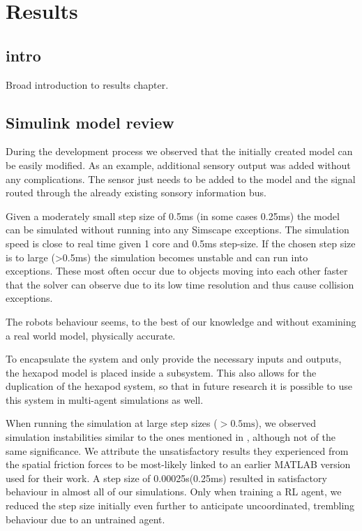 \chapter{Results}
\label{ch:results}
\section{intro}
Broad introduction to results chapter.




\section{Simulink model review}
During the development process we observed that the initially created model can be easily modified.
As an example, additional sensory output was added without any complications.
The sensor just needs to be added to the model and the signal routed through the already existing sonsory information bus.

Given a moderately small step size of 0.5ms (in some cases 0.25ms) the model can be simulated without running into any Simscape exceptions.
The simulation speed is close to real time given 1 core and 0.5ms step-size.
If the chosen step size is to large (>0.5ms) the simulation becomes unstable and can run into exceptions.
These most often occur due to objects moving into each other faster that the solver can observe due to its low time resolution and thus cause collision exceptions.

The robots behaviour seems, to the best of our knowledge and without examining a real world model, physically accurate.

To encapsulate the system and only provide the necessary inputs and outputs, the hexapod model is placed inside a subsystem.
This also allows for the duplication of the hexapod system, so that in future research it is possible to use this system in multi-agent simulations as well.

When running the simulation at large step sizes ($>0.5 \text{ms}$), we observed simulation instabilities similar to the ones mentioned in \parencite{thilderkvist2015motion}, although not of the same significance.
We attribute the unsatisfactory results they experienced from the spatial friction forces to be most-likely linked to an earlier MATLAB version used for their work.
A step size of 0.00025s(0.25ms) resulted in satisfactory behaviour in almost all of our simulations.
Only when training a RL agent, we reduced the step size initially even further to anticipate uncoordinated, trembling behaviour due to an untrained agent.


